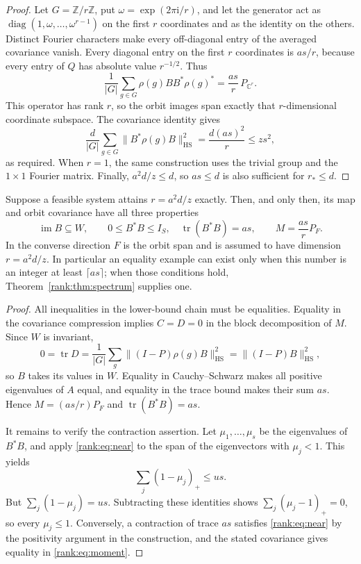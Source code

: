 \begin{proof}
Let $G=\mathbb Z/r\mathbb Z$, put $\omega=\exp(2\pi\mathrm{i}/r)$,
and let the generator act as
$\operatorname{diag}(1,\omega,\ldots,\omega^{r-1})$ on the first
$r$ coordinates and as the identity on the others. Distinct Fourier
characters make every off-diagonal entry of the averaged covariance
vanish. Every diagonal entry on the first $r$ coordinates is $as/r$,
because every entry of $Q$ has absolute value $r^{-1/2}$. Thus
\[
 \frac1{|G|}\sum_{g\in G}\rho(g)BB^*\rho(g)^*
       =\frac{as}{r}\,P_{\mathbb C^r}.
\]
This operator has rank $r$, so the orbit images span exactly that
$r$-dimensional coordinate subspace. The covariance identity gives
\[
 \frac d{|G|}\sum_{g\in G}\|B^*\rho(g)B\|_{\mathrm{HS}}^2
       =\frac{d(as)^2}{r}\le zs^2,
\]
as required. When $r=1$, the same construction uses the trivial group
and the $1\times1$ Fourier matrix. Finally, $a^2d/z\le d$, so
$as\le d$ is also sufficient for $r_*\le d$.
\end{proof}

\begin{proposition}
\label{rank:prop:equality}
Suppose a feasible system attains
$r=a^2d/z$ exactly. Then, and only then, its map and orbit covariance
have all three properties
\[
 \operatorname{im}B\subseteq W,\qquad
 0\le B^*B\le I_S,\quad\operatorname{tr}(B^*B)=as,
 \qquad M=\frac{as}{r}P_F.
\]
In the converse direction $F$ is the orbit span and is assumed to have
dimension $r=a^2d/z$. In particular an equality example can exist only
when this number is an integer at least $\lceil as\rceil$; when those
conditions hold, Theorem~\ref{rank:thm:spectrum} supplies one.
\end{proposition}

\begin{proof}
All inequalities in the lower-bound chain must be equalities.
Equality in the covariance compression implies $C=D=0$ in the block
decomposition of $M$. Since $W$ is invariant,
\[
 0=\operatorname{tr}D
  =\frac1{|G|}\sum_g\|(I-P)\rho(g)B\|_{\mathrm{HS}}^2
  =\|(I-P)B\|_{\mathrm{HS}}^2,
\]
so $B$ takes its values in $W$. Equality in Cauchy--Schwarz makes all
positive eigenvalues of $A$ equal, and equality in the trace bound
makes their sum $as$. Hence $M=(as/r)P_F$ and
$\operatorname{tr}(B^*B)=as$.

It remains to verify the contraction assertion. Let $\mu_1,\ldots,\mu_s$
be the eigenvalues of $B^*B$, and apply \eqref{rank:eq:near} to the
span of the eigenvectors with $\mu_j<1$. This yields
\[
 \sum_j(1-\mu_j)_+\le us.
\]
But $\sum_j(1-\mu_j)=us$. Subtracting these identities shows
$\sum_j(\mu_j-1)_+=0$, so every $\mu_j\le1$.
Conversely, a contraction of trace $as$ satisfies
\eqref{rank:eq:near} by the positivity argument in the construction,
and the stated covariance gives equality in
\eqref{rank:eq:moment}.
\end{proof}

